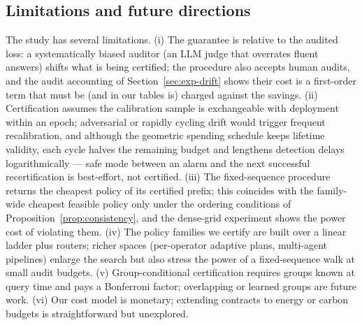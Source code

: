 \subsection{Limitations and future directions}
The study has several limitations. (i) The guarantee is relative to
the audited loss: a systematically biased auditor (an LLM judge that
overrates fluent answers) shifts what is being certified; the
procedure also accepts human audits, and the audit
accounting of Section~\ref{sec:exp-drift} shows their cost is a
first-order term that must be (and in our tables is) charged against
the savings. (ii) Certification assumes the calibration sample is
exchangeable with deployment within an epoch; adversarial or rapidly
cycling drift would trigger frequent recalibration, and although the
geometric spending schedule keeps lifetime validity, each cycle halves
the remaining budget and lengthens detection delays logarithmically
--- safe mode between an alarm and the next successful recertification
is best-effort, not certified. (iii) The fixed-sequence procedure
returns the cheapest policy of its certified prefix; this coincides
with the family-wide cheapest feasible policy only under the ordering
conditions of Proposition~\ref{prop:consistency}, and the dense-grid
experiment shows the power cost of violating them. (iv) The policy
families we certify are built over a linear ladder plus routers;
richer spaces (per-operator adaptive plans, multi-agent pipelines)
enlarge the search but also stress the power of a fixed-sequence walk
at small audit budgets. (v) Group-conditional certification requires
groups known at query time and pays a Bonferroni factor; overlapping
or learned groups are future work. (vi) Our cost model is monetary;
extending contracts to energy or carbon budgets is straightforward but
unexplored.

